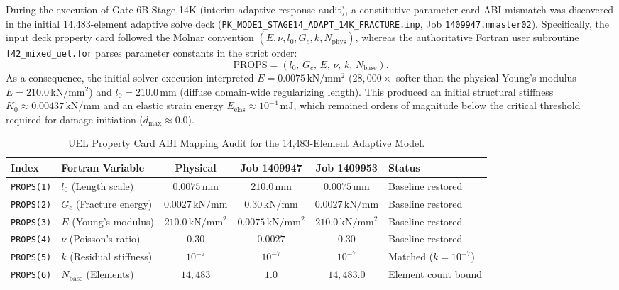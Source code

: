 During the execution of Gate-6B Stage 14K (interim adaptive-response audit), a constitutive parameter card ABI mismatch was discovered in the initial 14,483-element adaptive solve deck (\texttt{PK\_MODE1\_STAGE14\_ADAPT\_14K\_FRACTURE.inp}, Job \texttt{1409947.mmaster02}). Specifically, the input deck property card followed the Molnar convention $(E, \nu, l_0, G_c, k, N_{\mathrm{phys}})$, whereas the authoritative Fortran user subroutine \texttt{f42\_mixed\_uel.for} parses parameter constants in the strict order:
\begin{equation}
\label{eq:f42_abi_order}
\mathrm{PROPS} = \left( l_0, \, G_c, \, E, \, \nu, \, k, \, N_{\mathrm{base}} \right).
\end{equation}
As a consequence, the initial solver execution interpreted $E = 0.0075\,\mathrm{kN/mm^2}$ ($28,000\times$ softer than the physical Young's modulus $E=210.0\,\mathrm{kN/mm^2}$) and $l_0 = 210.0\,\mathrm{mm}$ (diffuse domain-wide regularizing length). This produced an initial structural stiffness $K_0 \approx 0.00437\,\mathrm{kN/mm}$ and an elastic strain energy $E_{\mathrm{elas}} \approx 10^{-4}\,\mathrm{mJ}$, which remained orders of magnitude below the critical threshold required for damage initiation ($d_{\max} \approx 0.0$).

\begin{table}[htbp]
\centering
\footnotesize
\caption{UEL Property Card ABI Mapping Audit for the 14,483-Element Adaptive Model.}
\label{tab:stage14l_abi_audit}
\begin{tabularx}{\textwidth}{p{1.4cm} p{2.2cm} c c c X}
\toprule
\textbf{Index} & \textbf{Fortran Variable} & \textbf{Physical} & \textbf{Job 1409947} & \textbf{Job 1409953} & \textbf{Status} \\
\midrule
\texttt{PROPS(1)} & $l_0$ (Length scale) & $0.0075\,\mathrm{mm}$ & $210.0\,\mathrm{mm}$ & $0.0075\,\mathrm{mm}$ & Baseline restored \\
\texttt{PROPS(2)} & $G_c$ (Fracture energy) & $0.0027\,\mathrm{kN/mm}$ & $0.30\,\mathrm{kN/mm}$ & $0.0027\,\mathrm{kN/mm}$ & Baseline restored \\
\texttt{PROPS(3)} & $E$ (Young's modulus) & $210.0\,\mathrm{kN/mm^2}$ & $0.0075\,\mathrm{kN/mm^2}$ & $210.0\,\mathrm{kN/mm^2}$ & Baseline restored \\
\texttt{PROPS(4)} & $\nu$ (Poisson's ratio) & $0.30$ & $0.0027$ & $0.30$ & Baseline restored \\
\texttt{PROPS(5)} & $k$ (Residual stiffness) & $10^{-7}$ & $10^{-7}$ & $10^{-7}$ & Matched ($k=10^{-7}$) \\
\texttt{PROPS(6)} & $N_{\mathrm{base}}$ (Elements) & $14,483$ & $1.0$ & $14,483.0$ & Element count bound \\
\bottomrule
\end{tabularx}
\end{table}

